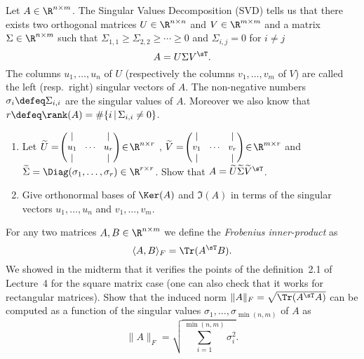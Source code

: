 \documentclass[11pt,nocut]{article}
\begin{document}




\begin{problem}[2 points]
	Let $A \in \R^{n \times m}$. The Singular Values Decomposition (SVD) tells us that there exists two orthogonal matrices $U \in \R^{n \times n}$ and $V \in \R^{m \times m}$ and a matrix $\Sigma \in \R^{n \times m}$ such that $\Sigma_{1,1} \geq \Sigma_{2,2}  \geq \cdots \geq 0$ and $\Sigma_{i,j} = 0$ for $i\neq j$
	$$
	A = U \Sigma V^{\sT}.
	$$
	The columns $u_1, \dots, u_n$ of $U$ (respectively the columns $v_1, \dots, v_m$ of $V$) are called the left (resp.\ right) singular vectors of $A$. The non-negative numbers $\sigma_i \defeq \Sigma_{i,i}$ are the singular values of $A$. Moreover we also know that $r \defeq \rank(A) = \# \{i \, | \, \Sigma_{i,i} \neq 0 \}$.
	\begin{enumerate}[label=\normalfont(\textbf{\alph*})]
		\item Let 
			$\widetilde{U} = \!
			{\small \begin{pmatrix}
					| & & | \\
					u_1 & \!\cdots\! & u_r \\
					| & & | 
			\end{pmatrix} } \! \in \! \R^{n \times r}$ ,
			$\widetilde{V} = \!
			{\small \begin{pmatrix}
					| & & | \\
					v_1 & \!\cdots\! & v_r \\
					| & & | 
			\end{pmatrix} } \! \in \! \R^{m \times r}$ and
			$\widetilde{\Sigma} = \Diag(\sigma_1, \dots, \sigma_r) \in \R^{r \times r}$.
			Show that $A = \widetilde{U}\widetilde{\Sigma}\widetilde{V}^{\sT}$.
		\item Give orthonormal bases of $\Ker(A)$ and $\Im(A)$ in terms of the singular vectors $u_1, \dots, u_n$ and $v_1, \dots , v_m$.
	\end{enumerate}
\end{problem}

\vspace{5mm}

\begin{problem}[2 points]
	For any two matrices $A,B \in \R^{n\times m}$ we define the \emph{Frobenius inner-product} as
	$$
	\langle A,B \rangle_{F} = \Tr(A^{\sT} B).
	$$
	We showed in the midterm that it verifies the points of the definition~2.1 of Lecture~4 for the square matrix case (one can also check that it works for rectangular matrices). Show that the induced norm $\|A\|_F = \sqrt{\Tr(A^{\sT} A)}$ can be computed as a function of the singular values $\sigma_1, \dots, \sigma_{\min(n,m)}$ of $A$ as
			$$
			\|A\|_F = \sqrt{\sum_{i=1}^{\min(n,m)} \sigma_i^2}
			.$$
\end{problem}
\end{document}

